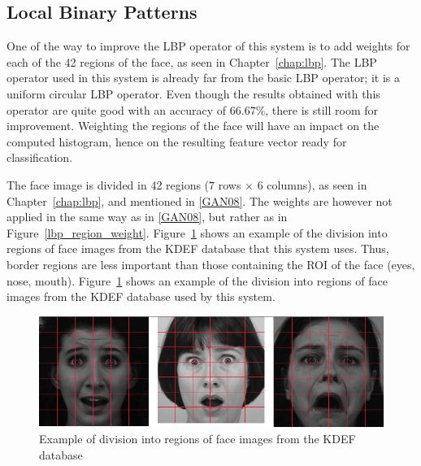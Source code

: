 \subsection{Local Binary Patterns}

\vspace{\baselineskip}
\noindent One of the way to improve the LBP operator of this system is to add weights for each of the 42 regions of the face, as seen in Chapter~\ref{chap:lbp}. The LBP operator used in this system is already far from the basic LBP operator; it is a uniform circular LBP operator. Even though the results obtained with this operator are quite good with an accuracy of $ 66.67\% $, there is still room for improvement. Weighting the regions of the face will have an impact on the computed histogram, hence on the resulting feature vector ready for classification. \newline

\noindent The face image is divided in 42 regions ($ 7 $ rows $\times$ $ 6 $ columns), as seen in Chapter~\ref{chap:lbp}, and mentioned in \ref{GAN08}. The weights are however not applied in the same way as in \ref{GAN08}, but rather as in Figure~\ref{lbp_region_weight}. Figure~\ref{implementation_weight_example} shows an example of the division into regions of face images from the KDEF database that this system uses. Thus, border regions are less important than those containing the ROI of the face (eyes, nose, mouth). Figure~\ref{implementation_weight_example} shows an example of the division into regions of face images from the KDEF database used by this system.
\newline

\begin{figure}[!h]
\begin{center}
\noindent \includegraphics[scale=0.5]{figures/implementation_weight_example} 
\newline
\caption{Example of division into regions of face images from the KDEF database}
\label{implementation_weight_example}
\end{center} 
\end{figure}


